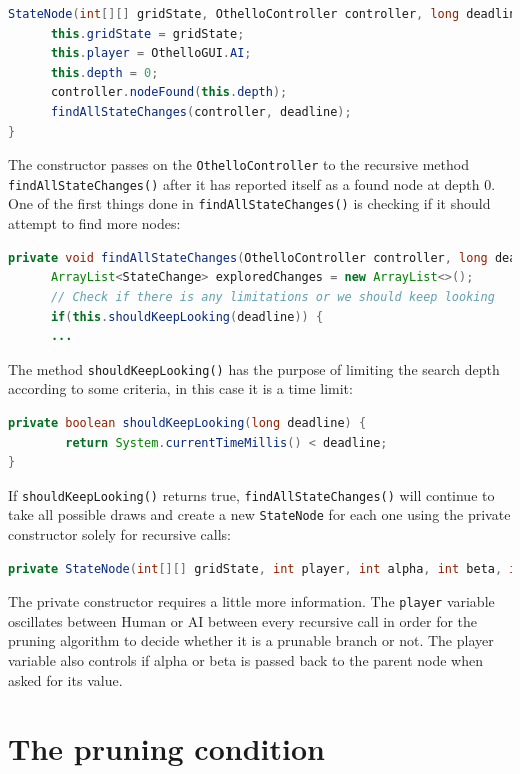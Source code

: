 \documentclass{article}
\begin{document}
\begin{lstlisting}[language=Java]
StateNode(int[][] gridState, OthelloController controller, long deadline){
      this.gridState = gridState;
      this.player = OthelloGUI.AI;
      this.depth = 0;
      controller.nodeFound(this.depth);
      findAllStateChanges(controller, deadline);
}
\end{lstlisting}

The constructor passes on the \verb|OthelloController| to the recursive method
\verb|findAllStateChanges()| after it has reported itself as a found node at depth 0.
One of the first things done in \verb|findAllStateChanges()| is checking if it should
attempt to find more nodes:

\begin{lstlisting}[language=Java]
private void findAllStateChanges(OthelloController controller, long deadline){
      ArrayList<StateChange> exploredChanges = new ArrayList<>();
      // Check if there is any limitations or we should keep looking
      if(this.shouldKeepLooking(deadline)) {
      ...
\end{lstlisting}

The method \verb|shouldKeepLooking()| has the purpose of limiting the search depth
according to some criteria, in this case it is a time limit:

\begin{lstlisting}[language=Java]
private boolean shouldKeepLooking(long deadline) {
        return System.currentTimeMillis() < deadline;
}
\end{lstlisting}

If \verb|shouldKeepLooking()| returns true, \verb|findAllStateChanges()| will continue to take
all possible draws and create a new \verb|StateNode| for each one using the private
constructor solely for recursive calls:

\begin{lstlisting}[language=Java]
private StateNode(int[][] gridState, int player, int alpha, int beta, int depth, OthelloController controller, long deadline)
\end{lstlisting}

The private constructor requires a little more information. The \verb|player|
variable oscillates between Human or AI between every recursive call in order for the
pruning algorithm to decide whether it is a prunable branch or not. The player variable
also controls if alpha or beta is passed back to the parent node when asked for its value.

\section{The pruning condition}
\end{document}
